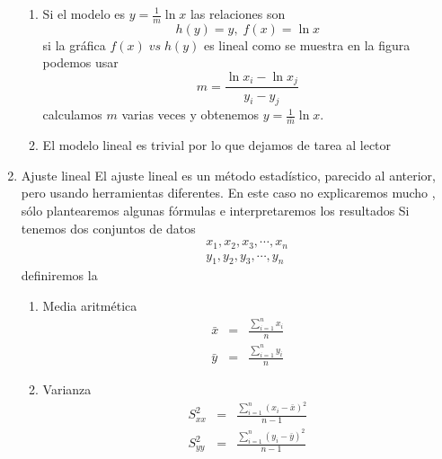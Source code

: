\documentclass[12pt]{article}
\begin{document}
\begin{enumerate}
\begin{enumerate}
\item  Si el modelo es $y=\frac{1}{m}\ln x$ las relaciones son 
\begin{equation*}
h\left( y\right) =y,\;f\left( x\right) =\ln x
\end{equation*}
si la gr\'{a}fica $f\left( x\right) \;vs\;h\left( y\right) $ es lineal como
se muestra en la figura podemos usar 
\begin{equation*}
m=\frac{\ln x_{i}-\ln x_{j}}{y_{i}-y_{j}}
\end{equation*}
calculamos $m$ varias veces y obtenemos $y=\frac{1}{\bar{m}}\ln x.$

\item  El modelo lineal es trivial por lo que dejamos de tarea al lector
\end{enumerate}

\item  Ajuste lineal\newline
El ajuste lineal es un m\'{e}todo estad\'{i}stico, parecido al anterior,
pero usando herramientas diferentes.\newline
En este caso no explicaremos mucho , s\'{o}lo plantearemos algunas
f\'{o}rmulas e interpretaremos los resultados \newline
Si tenemos dos conjuntos de datos 
\begin{eqnarray*}
&&x_{1},x_{2},x_{3},\cdots ,x_{n} \\
&&y_{1},y_{2},y_{3},\cdots ,y_{n}
\end{eqnarray*}
definiremos la

\begin{enumerate}
\item  Media aritm\'{e}tica 
\begin{eqnarray*}
\bar{x} &=&\frac{\sum_{i=1}^{n}x_{i}}{n} \\
\bar{y} &=&\frac{\sum_{i=1}^{n}y_{i}}{n}
\end{eqnarray*}

\item  Varianza 
\begin{eqnarray*}
S_{xx}^{2} &=&\frac{\sum_{i=1}^{n}(x_{i}-\bar{x})^{2}}{n-1} \\
S_{yy}^{2} &=&\frac{\sum_{i=1}^{n}(y_{i}-\bar{y})^{2}}{n-1}
\end{eqnarray*}


\end{enumerate}
\end{enumerate}
\end{document}
